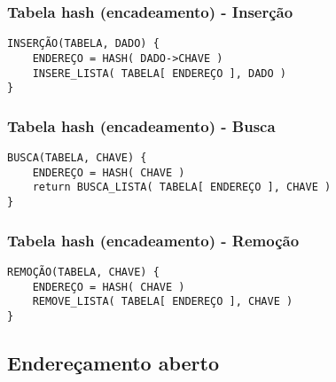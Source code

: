 \documentclass[10pt,svgnames]{beamer}
\begin{document}


\begin{frame}[fragile]
\frametitle{Tabela hash (encadeamento) - Inserção}
\begin{verbatim}
INSERÇÃO(TABELA, DADO) {
    ENDEREÇO = HASH( DADO->CHAVE )
    INSERE_LISTA( TABELA[ ENDEREÇO ], DADO )
}
\end{verbatim}
\end{frame}

\begin{frame}[fragile]
\frametitle{Tabela hash (encadeamento) - Busca}
\begin{verbatim}
BUSCA(TABELA, CHAVE) {
    ENDEREÇO = HASH( CHAVE )
    return BUSCA_LISTA( TABELA[ ENDEREÇO ], CHAVE )
}
\end{verbatim}
\end{frame}

\begin{frame}[fragile]
\frametitle{Tabela hash (encadeamento) - Remoção}
\begin{verbatim}
REMOÇÃO(TABELA, CHAVE) {
    ENDEREÇO = HASH( CHAVE )
    REMOVE_LISTA( TABELA[ ENDEREÇO ], CHAVE )
}
\end{verbatim}
\end{frame}

\subsection{Endereçamento aberto}

\end{document}

